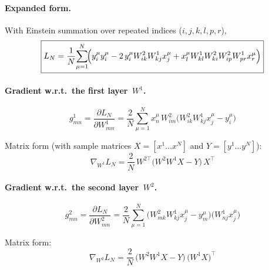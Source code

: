\documentclass[11pt]{article}
\begin{document}
\paragraph{Expanded form.}
With Einstein summation over repeated indices (\(i,j,k,l,p,r\)),
\[
\boxed{
L_N=\frac{1}{N}\!
     \sum_{\mu=1}^{N}\!
     \Bigl(
           y^{\mu}_{i}y^{\mu}_{i}
           -2\,y^{\mu}_{i}W^{2}_{ik}W^{1}_{kj}x^{\mu}_{j}
           +x^{\mu}_{l}W^{1}_{kl}W^{2}_{ki}W^{2}_{ip}W^{1}_{pr}x^{\mu}_{r}
     \Bigr)}
\]
\paragraph{Gradient w.r.t.\ the first layer \(\,W^{1}\).}
\[
\boxed{
g^{1}_{mn}
   =\frac{\partial L_N}{\partial W^{1}_{mn}}
   =\frac{2}{N}\sum_{\mu=1}^{N}
     x^{\mu}_{n}\,
     W^{2}_{i m}
     \bigl(
           W^{2}_{i k}W^{1}_{k j}x^{\mu}_{j}-y^{\mu}_{i}
     \bigr)}
\]

\noindent
Matrix form (with sample matrices \(X=[x^{1}\!\dots x^{N}]\) and
\(Y=[y^{1}\!\dots y^{N}]\)):
\[
\boxed{
\nabla_{W^{1}}L_N
   =\frac{2}{N}\,W^{2\!\top}
     \bigl(W^{2}W^{1}X-Y\bigr)\,X^{\!\top}}
\]

\paragraph{Gradient w.r.t.\ the second layer \(\,W^{2}\).}
\[
\boxed{
g^{2}_{mn}
   =\frac{\partial L_N}{\partial W^{2}_{mn}}
   =\frac{2}{N}\sum_{\mu=1}^{N}
     \bigl(
          W^{2}_{m k}W^{1}_{k j}x^{\mu}_{j}-y^{\mu}_{m}
     \bigr)
     \bigl(
          W^{1}_{n j}x^{\mu}_{j}
     \bigr)}
\]

\noindent
Matrix form:
\[
\boxed{
\nabla_{W^{2}}L_N
   =\frac{2}{N}\,
     \bigl(W^{2}W^{1}X-Y\bigr)\,
     \bigl(W^{1}X\bigr)^{\!\top}}
\]
\end{document}
